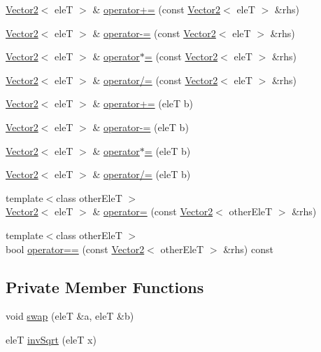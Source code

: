 \begin{DoxyCompactItemize}
\item 
\hyperlink{classfc_1_1Vector2}{Vector2}$<$ eleT $>$ \& \hyperlink{classfc_1_1Vector2_aa85cc460abc8809bd278cc1a37a34738}{operator+=} (const \hyperlink{classfc_1_1Vector2}{Vector2}$<$ eleT $>$ \&rhs)
\item 
\hyperlink{classfc_1_1Vector2}{Vector2}$<$ eleT $>$ \& \hyperlink{classfc_1_1Vector2_acf30967fe6f42911aeea516543eb726e}{operator-\/=} (const \hyperlink{classfc_1_1Vector2}{Vector2}$<$ eleT $>$ \&rhs)
\item 
\hyperlink{classfc_1_1Vector2}{Vector2}$<$ eleT $>$ \& \hyperlink{classfc_1_1Vector2_acbc36b7ced69acf8fa5094e216bf45a7}{operator$\ast$=} (const \hyperlink{classfc_1_1Vector2}{Vector2}$<$ eleT $>$ \&rhs)
\item 
\hyperlink{classfc_1_1Vector2}{Vector2}$<$ eleT $>$ \& \hyperlink{classfc_1_1Vector2_a3057882a89f1b623f706af68614a2fbf}{operator/=} (const \hyperlink{classfc_1_1Vector2}{Vector2}$<$ eleT $>$ \&rhs)
\item 
\hyperlink{classfc_1_1Vector2}{Vector2}$<$ eleT $>$ \& \hyperlink{classfc_1_1Vector2_a226e562bb44d66cb24803dc79993910c}{operator+=} (eleT b)
\item 
\hyperlink{classfc_1_1Vector2}{Vector2}$<$ eleT $>$ \& \hyperlink{classfc_1_1Vector2_aea3fcca0a96a88e0d8623a07e140c669}{operator-\/=} (eleT b)
\item 
\hyperlink{classfc_1_1Vector2}{Vector2}$<$ eleT $>$ \& \hyperlink{classfc_1_1Vector2_ae6933cec78beb94e5bea5bb82c8be583}{operator$\ast$=} (eleT b)
\item 
\hyperlink{classfc_1_1Vector2}{Vector2}$<$ eleT $>$ \& \hyperlink{classfc_1_1Vector2_ae4beebb75151dff1208d6e02c4b9a471}{operator/=} (eleT b)
\item 
{\footnotesize template$<$class other\+EleT $>$ }\\\hyperlink{classfc_1_1Vector2}{Vector2}$<$ eleT $>$ \& \hyperlink{classfc_1_1Vector2_a2bf9246d95a97c3f3883fd7b22c45f6e}{operator=} (const \hyperlink{classfc_1_1Vector2}{Vector2}$<$ other\+EleT $>$ \&rhs)
\item 
{\footnotesize template$<$class other\+EleT $>$ }\\bool \hyperlink{classfc_1_1Vector2_a05acd66d911bf36944147ca102db1000}{operator==} (const \hyperlink{classfc_1_1Vector2}{Vector2}$<$ other\+EleT $>$ \&rhs) const
\end{DoxyCompactItemize}
\subsection*{Private Member Functions}
\begin{DoxyCompactItemize}
\item 
void \hyperlink{classfc_1_1Vector2_a26132f5546aacaf025d2b26c00617c67}{swap} (eleT \&a, eleT \&b)
\item 
eleT \hyperlink{classfc_1_1Vector2_a04efdac7c236942670b5a937835b3330}{inv\+Sqrt} (eleT x)
\end{DoxyCompactItemize}
